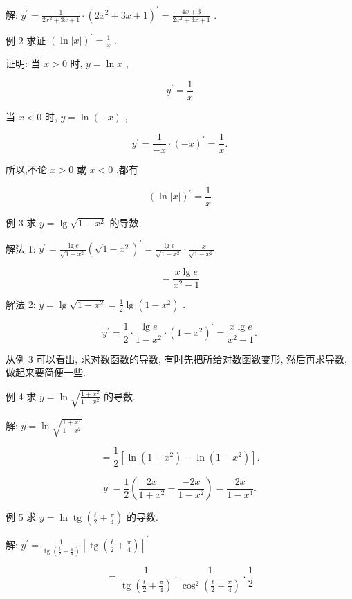 \documentclass[10pt]{article}
\begin{document}
解: \({y}^{\prime } = \frac{1}{2{x}^{2} + {3x} + 1} \cdot {\left( 2{x}^{2} + 3x + 1\right) }^{\prime } = \frac{{4x} + 3}{2{x}^{2} + {3x} + 1}\) .

例 2 求证 \({\left( \ln \left| x\right| \right) }^{\prime } = \frac{1}{x}\) .

证明: 当 \(x > 0\) 时, \(y = \ln x\) ,

\[
{y}^{\prime } = \frac{1}{x}
\]

当 \(x < 0\) 时, \(y = \ln \left( {-x}\right)\) ,

\[
{y}^{\prime } = \frac{1}{-x} \cdot {\left( -x\right) }^{\prime } = \frac{1}{x}.
\]

所以,不论 \(x > 0\) 或 \(x < 0\) ,都有

\[
{\left( \ln \left| x\right| \right) }^{\prime } = \frac{1}{x}
\]

例 3 求 \(y = \lg \sqrt{1 - {x}^{2}}\) 的导数.

解法 1: \({y}^{\prime } = \frac{\lg e}{\sqrt{1 - {x}^{2}}}{\left( \sqrt{1 - {x}^{2}}\right) }^{\prime } = \frac{\lg e}{\sqrt{1 - {x}^{2}}} \cdot \frac{-x}{\sqrt{1 - {x}^{2}}}\)

\[
= \frac{x\lg e}{{x}^{2} - 1}
\]

解法 2: \(y = \lg \sqrt{1 - {x}^{2}} = \frac{1}{2}\lg \left( {1 - {x}^{2}}\right)\) .

\[
{y}^{\prime } = \frac{1}{2} \cdot \frac{\lg e}{1 - {x}^{2}} \cdot {\left( 1 - {x}^{2}\right) }^{\prime } = \frac{x\lg e}{{x}^{2} - 1}.
\]

从例 3 可以看出, 求对数函数的导数, 有时先把所给对数函数变形, 然后再求导数, 做起来要简便一些.

例 4 求 \(y = \ln \sqrt{\frac{1 + {x}^{2}}{1 - {x}^{2}}}\) 的导数.

解: \(y = \ln \sqrt{\frac{1 + {x}^{2}}{1 - {x}^{2}}}\)

\[
= \frac{1}{2}\left\lbrack {\ln \left( {1 + {x}^{2}}\right) - \ln \left( {1 - {x}^{2}}\right) }\right\rbrack \text{.}
\]

\[
{y}^{\prime } = \frac{1}{2}\left( {\frac{2x}{1 + {x}^{2}} - \frac{-{2x}}{1 - {x}^{2}}}\right) = \frac{2x}{1 - {x}^{4}}.
\]

例 5 求 \(y = \ln \operatorname{tg}\left( {\frac{t}{2} + \frac{\pi }{4}}\right)\) 的导数.

解: \({y}^{\prime } = \frac{1}{\operatorname{tg}\left( {\frac{t}{2} + \frac{\pi }{4}}\right) }{\left\lbrack \operatorname{tg}\left( \frac{t}{2} + \frac{\pi }{4}\right) \right\rbrack }^{\prime }\)

\[
= \frac{1}{\operatorname{tg}\left( {\frac{t}{2} + \frac{\pi }{4}}\right) } \cdot \frac{1}{{\cos }^{2}\left( {\frac{t}{2} + \frac{\pi }{4}}\right) } \cdot \frac{1}{2}
\]
\end{document}
